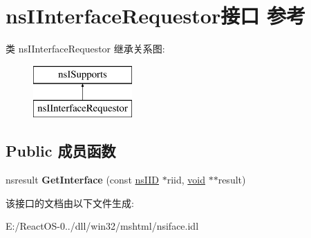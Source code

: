 \hypertarget{interfacens_i_interface_requestor}{}\section{ns\+I\+Interface\+Requestor接口 参考}
\label{interfacens_i_interface_requestor}
类 ns\+I\+Interface\+Requestor 继承关系图\+:\begin{figure}[H]
\begin{center}
\leavevmode
\includegraphics[height=2.000000cm]{interfacens_i_interface_requestor}
\end{center}
\end{figure}
\subsection*{Public 成员函数}
\begin{DoxyCompactItemize}
\item 
\mbox{\label{interfacens_i_interface_requestor_a9a10572b1100058a3e57803cdeb99f91}} 
nsresult {\bfseries Get\+Interface} (const \hyperlink{struct___i_i_d}{ns\+I\+ID} $\ast$riid, \hyperlink{interfacevoid}{void} $\ast$$\ast$result)
\end{DoxyCompactItemize}


该接口的文档由以下文件生成\+:\begin{DoxyCompactItemize}
\item 
E\+:/\+React\+O\+S-\/0../dll/win32/mshtml/nsiface.\+idl\end{DoxyCompactItemize}
